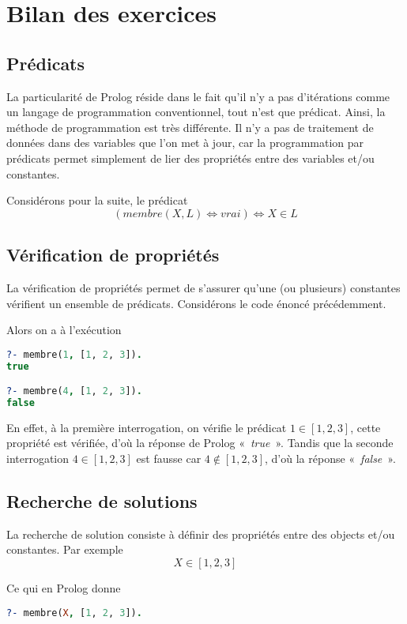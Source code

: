 \chapter{Bilan des exercices}

\section{Prédicats}

La particularité de Prolog réside dans le fait qu'il n'y a pas d'itérations comme
un langage de programmation conventionnel, tout n'est que prédicat. Ainsi, la
méthode de programmation est très différente. Il n'y a pas de traitement de données
dans des variables que l'on met à jour, car la programmation par prédicats permet
simplement de lier des propriétés entre des variables et/ou constantes.

Considérons pour la suite, le prédicat
\[(membre(X, L) \Leftrightarrow vrai) \Leftrightarrow X \in L\]


\section{Vérification de propriétés}

La vérification de propriétés permet de s'assurer qu'une (ou plusieurs) constantes
vérifient un ensemble de prédicats. Considérons le code énoncé précédemment.

Alors on a à l'exécution

\begin{lstlisting}[language=Prolog,frame=single]
?- membre(1, [1, 2, 3]).
true

?- membre(4, [1, 2, 3]).
false
\end{lstlisting}

En effet, à la première interrogation, on vérifie le prédicat $1 \in [1, 2, 3]$,
cette propriété est vérifiée, d'où la réponse de Prolog «~\textit{true}~». Tandis que la seconde interrogation $4 \in [1, 2, 3]$ est fausse car 
$4 \notin [1, 2, 3]$, d'où la réponse «~\textit{false}~».


\section{Recherche de solutions}

La recherche de solution consiste à définir des propriétés entre des
objects et/ou constantes. Par exemple
\[
	X \in [1, 2, 3]
\]

 Ce qui en Prolog donne
\begin{lstlisting}[language=Prolog,frame=single]
?- membre(X, [1, 2, 3]).
\end{lstlisting}

